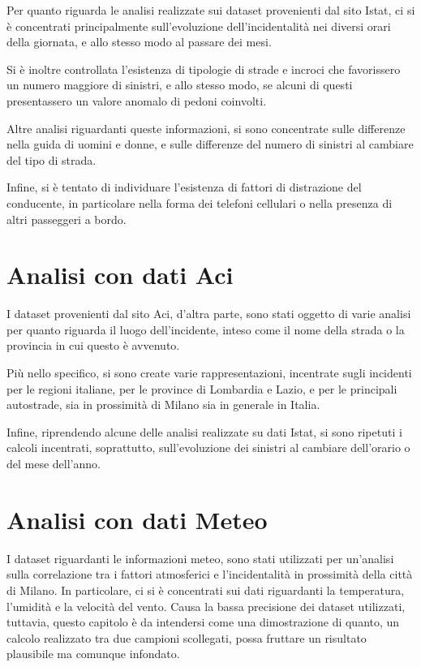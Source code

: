 \documentclass[a4paper]{article}
\begin{document}
Per quanto riguarda le analisi realizzate sui dataset provenienti dal sito Istat, 
ci si è concentrati principalmente sull'evoluzione dell'incidentalità nei diversi orari 
della giornata, e allo stesso modo al passare dei mesi. 

Si è inoltre controllata l'esistenza di tipologie di strade e incroci che favorissero 
un numero maggiore di sinistri, e allo stesso modo, se alcuni di questi presentassero 
un valore anomalo di pedoni coinvolti. 

Altre analisi riguardanti queste informazioni, si sono concentrate sulle differenze nella 
guida di uomini e donne, e sulle differenze del numero di sinistri al cambiare 
del tipo di strada. 

Infine, si è tentato di individuare l'esistenza di fattori di distrazione del 
conducente, in particolare nella forma dei telefoni cellulari o nella presenza 
di altri passeggeri a bordo. 

\section{Analisi con dati Aci}

I dataset provenienti dal sito Aci, d'altra parte, sono stati oggetto di varie analisi per 
quanto riguarda il luogo dell'incidente, inteso come il nome della strada o la provincia 
in cui questo è avvenuto. 

Più nello specifico, si sono create varie rappresentazioni, incentrate sugli incidenti 
per le regioni italiane, per le province di Lombardia e Lazio, e per le 
principali autostrade, sia in prossimità di Milano sia in generale in Italia. 

Infine, riprendendo alcune delle analisi realizzate su dati Istat, si sono ripetuti i 
calcoli incentrati, soprattutto, sull'evoluzione dei sinistri al cambiare dell'orario 
o del mese dell'anno.

\section{Analisi con dati Meteo}

I dataset riguardanti le informazioni meteo, sono stati utilizzati per un'analisi sulla 
correlazione tra i fattori atmosferici e l'incidentalità in 
prossimità della città di Milano. 
In particolare, ci si è concentrati sui dati riguardanti la temperatura, 
l'umidità e la velocità del vento. 
Causa la bassa precisione dei dataset utilizzati, tuttavia, questo capitolo è 
da intendersi come una dimostrazione di quanto, un calcolo realizzato tra due campioni 
scollegati, possa fruttare un risultato plausibile ma comunque infondato. 
\end{document}
